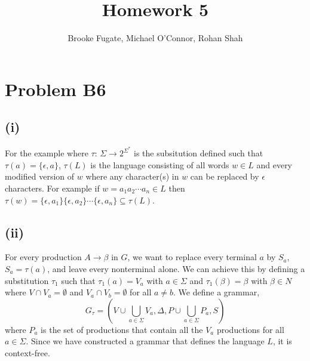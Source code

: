\documentclass[12pt]{article}
\begin{document}
\pagestyle{plain}
\titleformat{\subsection}[runin]
  {\normalfont\large\bfseries}{\thesubsection}{1em}{}

\title{Homework 5}
\author{Brooke Fugate, Michael O'Connor, Rohan Shah}
\date{}

\maketitle

\section*{Problem B6}

\subsection*{(i)} For the example where
$\tau$: $\Sigma \rightarrow 2^{\Sigma^*}$ is the subsitution defined such
that $\tau(a) = \{\epsilon, a\}$, $\tau(L)$ is the language consisting of all
words $w \in L$ and every modified version of $w$ where any character(s) in $w$
can be replaced by $\epsilon$ characters. For example if
$w=a_1a_2\cdots a_n \in L$ then
$\tau(w) = \{\epsilon, a_1\}\{\epsilon, a_2\}\cdots \{\epsilon, a_n\}
\subseteq \tau(L)$.

\subsection*{(ii)}
For every production $A \rightarrow \beta$ in $G$, we want to replace every
terminal $a$ by $S_a$, $S_a = \tau(a)$, and leave every nonterminal alone.
We can achieve this by defining a substitution $\tau_1$ such that
$\tau_1(a)=V_a$ with $a \in \Sigma$ and $\tau_1(\beta)=\beta$ with
$\beta \in N$ where $V \cap V_a = \emptyset$ and $V_a \cap V_b = \emptyset$
for all $a \neq b$. We define a grammar,
$$G_{\tau} = (V \cup \bigcup_{a \in \Sigma} V_a, \Delta,
P \cup \bigcup_{a \in \Sigma} P_a, S)$$
where $P_a$ is the set of productions that contain all the
$V_a$ productions for all $a \in \Sigma$. Since we have constructed a grammar
that defines the language $L$, it is context-free.
\end{document}

